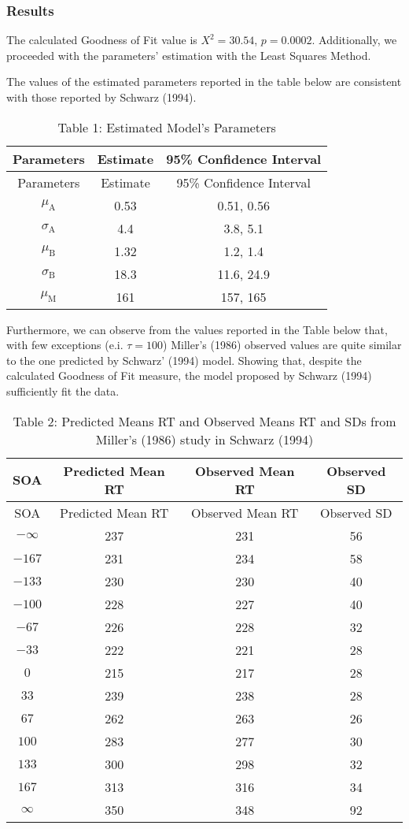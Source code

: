 \hypertarget{results}{%
\subsubsection{Results}\label{results}}

The calculated Goodness of Fit value is \(X^2= 30.54\), \(p= 0.0002\). Additionally, we proceeded with the parameters' estimation with the Least Squares Method.

The values of the estimated parameters reported in the table below are consistent with those reported by Schwarz (1994).

\begin{longtable}[]{@{}ccc@{}}
\caption{Table 1: Estimated Model's Parameters}\tabularnewline
\toprule()
Parameters & Estimate & 95\% Confidence Interval \\
\midrule()
\endfirsthead
\toprule()
Parameters & Estimate & 95\% Confidence Interval \\
\midrule()
\endhead
\(\mu_ \mathrm A\) & 0.53 & 0.51, 0.56 \\
\(\sigma_ \mathrm A\) & 4.4 & 3.8, 5.1 \\
\(\mu_ \mathrm B\) & 1.32 & 1.2, 1.4 \\
\(\sigma_ \mathrm B\) & 18.3 & 11.6, 24.9 \\
\(\mu_ \mathrm M\) & 161 & 157, 165 \\
\bottomrule()
\end{longtable}

Furthermore, we can observe from the values reported in the Table below that, with few exceptions (e.i. \(\tau= 100\)) Miller's (1986) observed values are quite similar to the one predicted by Schwarz' (1994) model. Showing that, despite the calculated Goodness of Fit measure, the model proposed by Schwarz (1994) sufficiently fit the data.

\begin{longtable}[]{@{}cccc@{}}
\caption{Table 2: Predicted Means RT and Observed Means RT and SDs from Miller's (1986) study in Schwarz (1994)}\tabularnewline
\toprule()
SOA & Predicted Mean RT & Observed Mean RT & Observed SD \\
\midrule()
\endfirsthead
\toprule()
SOA & Predicted Mean RT & Observed Mean RT & Observed SD \\
\midrule()
\endhead
\(-\infty\) & 237 & 231 & 56 \\
\(-167\) & 231 & 234 & 58 \\
\(-133\) & 230 & 230 & 40 \\
\(-100\) & 228 & 227 & 40 \\
\(-67\) & 226 & 228 & 32 \\
\(-33\) & 222 & 221 & 28 \\
\(0\) & 215 & 217 & 28 \\
\(33\) & 239 & 238 & 28 \\
\(67\) & 262 & 263 & 26 \\
\(100\) & 283 & 277 & 30 \\
\(133\) & 300 & 298 & 32 \\
\(167\) & 313 & 316 & 34 \\
\(\infty\) & 350 & 348 & 92 \\
\bottomrule()
\end{longtable}

